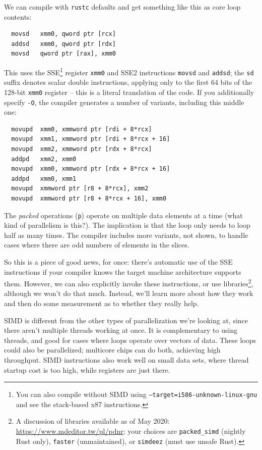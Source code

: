 We can compile with \texttt{rustc} defaults
and get something like this as core loop contents:
\begin{verbatim}
  movsd   xmm0, qword ptr [rcx]
  addsd   xmm0, qword ptr [rdx]
  movsd   qword ptr [rax], xmm0
\end{verbatim}
This uses the SSE\footnote{You can also compile without SIMD using \texttt{--target=i586-unknown-linux-gnu} and see the stack-based x87 instructions.} register \texttt{xmm0} and SSE2 instructions \texttt{movsd} and
\texttt{addsd}; the \texttt{sd} suffix denotes scalar double instructions, applying
only to the first 64 bits of the 128-bit \texttt{xmm0} register -- this is a literal
translation of the code. If you additionally specify \texttt{-O}, the compiler generates a number of variants, including this middle one:
\begin{verbatim}
  movupd  xmm0, xmmword ptr [rdi + 8*rcx]
  movupd  xmm1, xmmword ptr [rdi + 8*rcx + 16]
  movupd  xmm2, xmmword ptr [rdx + 8*rcx]
  addpd   xmm2, xmm0
  movupd  xmm0, xmmword ptr [rdx + 8*rcx + 16]
  addpd   xmm0, xmm1
  movupd  xmmword ptr [r8 + 8*rcx], xmm2
  movupd  xmmword ptr [r8 + 8*rcx + 16], xmm0
\end{verbatim}
The \emph{packed} operations ({\tt p}) operate on multiple data
elements at a time (what kind of parallelism is this?). The
implication is that the loop only needs to loop half as many times.
The compiler includes more variants, not shown, to handle cases where
there are odd numbers of elements in the slices.

So this is a piece of good news, for once: there's automatic use of the SSE instructions if your compiler knows the target machine architecture supports them. However, we can also explicitly invoke these instructions, or use libraries\footnote{A discussion of libraries available as of May 2020: \url{https://www.mdeditor.tw/pl/pdnr}; your choices are \texttt{packed\_simd} (nightly Rust only), \texttt{faster} (unmaintained), or \texttt{simdeez} (must use unsafe Rust).}, although we won't do that much. Instead, we'll learn more about how they work and then do some measurement as to whether they really help.

SIMD is different from the other types of parallelization we're
looking at, since there aren't multiple threads working at once.
It is complementary to using threads, and good for cases
where loops operate over vectors of data. These loops could also be
parallelized; multicore chips can do both, achieving high throughput.
SIMD instructions also work well on small data sets, where thread startup
cost is too high, while registers are just there.

